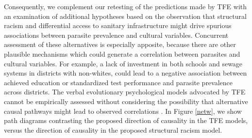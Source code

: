 \documentclass[12pt]{article}
\begin{document}
	Consequently, we complement our retesting of the predictions made by TFE with an examination of additional hypotheses based on the observation that structural racism and differential access to sanitary infrastructure might drive spurious associations between parasite prevalence and cultural variables.  Concurrent assessment of these alternatives is especially apposite, because there are other plausible mechanisms which could generate a correlation between parasites and cultural variables. For example, a lack of investment in both schools and sewage systems in districts with non-whites, could lead to a negative association between achieved education or standardized test performance and parasite prevalence across districts. The verbal evolutionary psychological models advocated by TFE cannot be empirically assessed without considering the possibility that alternative causal pathways might lead to observed correlations \citep[see][]{hackman2013fast, gravlee2009race}. In Figure \ref{netw}, we show path diagrams contrasting the proposed direction of causality in the TFE models, versus the direction of causality in the proposed structural racism model.
	
\end{document}
